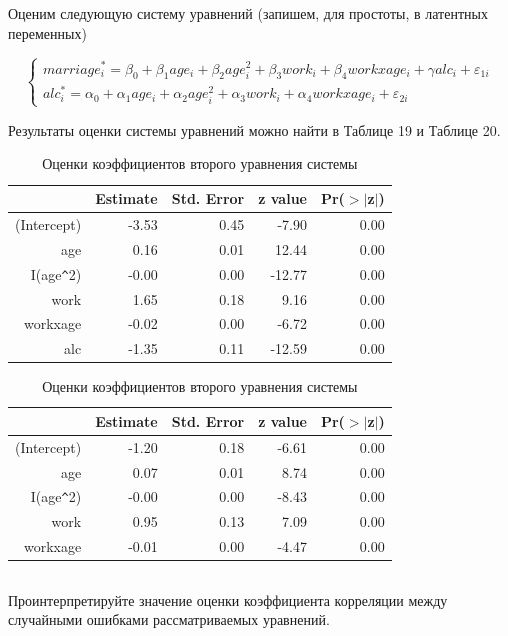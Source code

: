 \documentclass[a4paper,12pt]{article}
\def \e{\varepsilon}
\def \e{\varepsilon}
\begin{document}
Оценим следующую систему уравнений (запишем, для простоты, в латентных переменных)

\[\begin{cases} 
 marriage^*_i = \beta_0 + \beta_1 age_i + \beta_2 age_i^2 + \beta_3 work_i + \beta_4 workxage_i + \gamma alc_i + \e_{1i} \\
 alc^*_i = \alpha_0 + \alpha_1 age_i + \alpha_2 age_i^2 + \alpha_3 work_i + \alpha_4 workxage_i + \e_{2i}
\end{cases}\]

Результаты оценки системы уравнений можно найти в Таблице 19 и Таблице 20.

\begin{table}[ht]
	\centering
	\begin{tabular}{|rrrrr|}
		\hline
		& Estimate & Std. Error & z value & Pr($>$$|$z$|$) \\ 
		\hline
		(Intercept) & -3.53 & 0.45 & -7.90 & 0.00 \\ 
		age & 0.16 & 0.01 & 12.44 & 0.00 \\ 
		I(age\verb|^|2) & -0.00 & 0.00 & -12.77 & 0.00 \\ 
		work & 1.65 & 0.18 & 9.16 & 0.00 \\ 
		workxage & -0.02 & 0.00 & -6.72 & 0.00 \\ 
		alc & -1.35 & 0.11 & -12.59 & 0.00 \\ 
		\hline
	\end{tabular}
\caption{Оценки коэффициентов первого уравнения системы}
\vspace{2em}
	\centering
	\begin{tabular}{|rrrrr|}
		\hline
		& Estimate & Std. Error & z value & Pr($>$$|$z$|$) \\ 
		\hline
		(Intercept) & -1.20 & 0.18 & -6.61 & 0.00 \\ 
		age & 0.07 & 0.01 & 8.74 & 0.00 \\ 
		I(age\verb|^|2) & -0.00 & 0.00 & -8.43 & 0.00 \\ 
		work & 0.95 & 0.13 & 7.09 & 0.00 \\ 
		workxage & -0.01 & 0.00 & -4.47 & 0.00 \\ 
		\hline
	\end{tabular}
\caption{Оценки коэффициентов второго уравнения системы}
\end{table}

\subsection{}
\Sun Проинтерпретируйте значение оценки коэффициента корреляции между
случайными ошибками рассматриваемых уравнений.
\end{document}
